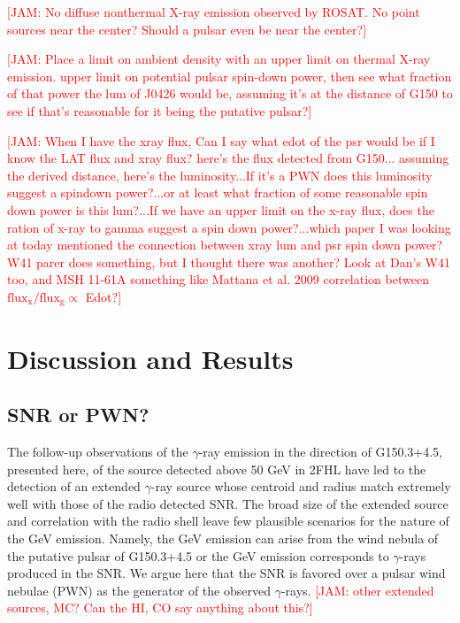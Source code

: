 \documentclass[iop]{emulateapj}
\newcommand{\kibitz}[2]{\ifnum\Comments=1\textcolor{#1}{#2}\fi}
\newcommand{\jamie}[1]{\kibitz{red}      {[JAM: #1]}}
\newcommand{\gam}{$\gamma$-ray}
\newcommand{\Gone}{G150.3+4.5}
\begin{document}
\jamie{No diffuse nonthermal X-ray emission observed by ROSAT. No point sources near the center? Should a  pulsar even  be near the center?}

\jamie{Place a limit on ambient density with an upper limit on thermal X-ray emission.  upper limit on potential pulsar spin-down power, then see what fraction of that power the lum of J0426 would be, assuming it's at the distance of G150 to see if that's reasonable for it being the putative pulsar?}

\jamie{When I have the xray flux, Can I say what edot of the psr would be if I know the LAT flux and xray flux? here's the flux detected from G150... assuming the derived distance, here's the luminosity...If it's a PWN does this luminosity suggest a spindown power?...or at least what fraction of some reasonable spin down power is this lum?...If we have an upper limit on the x-ray flux, does the ration of x-ray to gamma suggest a spin down power?...which paper I was looking at today mentioned the connection between xray lum and psr spin down power? W41 parer does something, but I thought there was another? Look at Dan's W41 too, and MSH 11-61A something like Mattana et al. 2009 correlation between  $\mathrm{flux_x / flux_g \propto}$   Edot?} 
%
%
\section{Discussion and Results}\label{sec:Discuss}
\subsection{SNR or PWN?}\label{sec:PWNvsSNR}

The follow-up observations of the \gam{} emission in the direction of \Gone{}, presented here, of the source detected above 50 GeV in 2FHL have led to the detection of an extended \gam{} source whose centroid and radius match extremely well with those of the radio detected SNR. The broad size of the extended source and correlation with the radio shell leave few plausible scenarios for the nature of the GeV emission. Namely, the GeV emission can arise from the wind nebula of the putative pulsar of \Gone{} or the GeV emission corresponds to \gam{}s produced in the SNR. We argue here that the SNR is favored over a pulsar wind nebulae (PWN) as the generator of the observed \gam{}s. \jamie{other extended sources, MC? Can the HI, CO say anything about this?}
\end{document}
